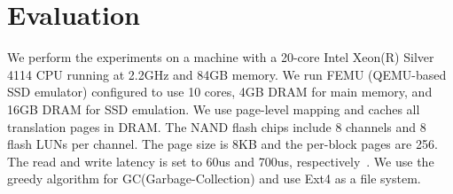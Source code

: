 \section{Evaluation}
We perform the experiments on a machine with a 20-core Intel Xeon(R) Silver
4114 CPU running at 2.2GHz and 84GB memory. We run FEMU (QEMU-based SSD
emulator) configured to use 10 cores, 4GB DRAM for main memory, and 16GB DRAM
for SSD emulation. We use page-level mapping and caches all translation pages in DRAM. 
The NAND flash chips include 8 channels and 8 flash
LUNs per channel. The page size is 8KB and the per-block pages are 256. The
read and write latency is set to 60us and 700us,
respectively~\cite{cheong2018flash}. We use the greedy algorithm for
GC(Garbage-Collection) and use Ext4 as a file system. 

